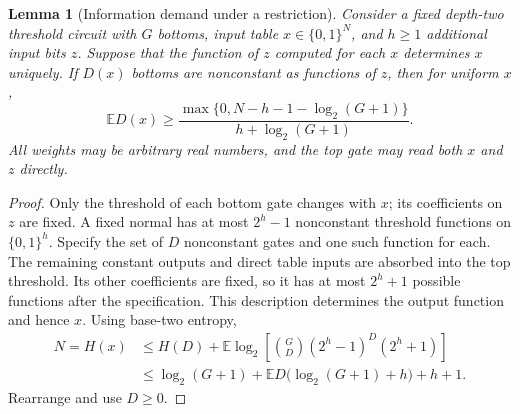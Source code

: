 \documentclass[11pt]{article}
\newtheorem{lemma}[theorem]{Lemma}
\newcommand{\bits}{\{0,1\}}
\begin{document}
\begin{lemma}[Information demand under a restriction]\label{lem:entropy}
Consider a fixed depth-two threshold circuit with $G$ bottoms, input table
$x\in\bits^N$, and $h\ge1$ additional input bits $z$. Suppose that the function
of $z$ computed for each $x$ determines $x$ uniquely. If $D(x)$ bottoms
are nonconstant as functions of $z$, then for uniform $x$,
$$
\mathbb E D(x)\ge
\frac{\max\{0,N-h-1-\log_2(G+1)\}}{h+\log_2(G+1)}.
$$
All weights may be arbitrary real numbers, and the top gate may read
both $x$ and $z$ directly.
\end{lemma}
\begin{proof}
Only the threshold of each bottom gate changes with $x$; its coefficients
on $z$ are fixed. A fixed normal has at most $2^h-1$ nonconstant threshold
functions on $\bits^h$. Specify the set of $D$ nonconstant gates and one
such function for each. The remaining constant outputs and direct table
inputs are absorbed into the top threshold. Its other coefficients are
fixed, so it has at most $2^h+1$ possible functions after the specification.
This description determines the output function and hence $x$.
Using base-two entropy,
\begin{align*}
N=H(x)&\le H(D)+\mathbb E\log_2\left[
 \binom GD(2^h-1)^D(2^h+1)\right]\\
&\le\log_2(G+1)+\mathbb E D\bigl(\log_2(G+1)+h\bigr)+h+1.
\end{align*}
Rearrange and use $D\ge0$.
\end{proof}
\end{document}
